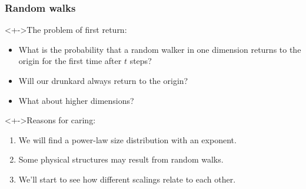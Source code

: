 \begin{frame}
  \frametitle{Random walks \hfill {}}

  \begin{block}<+->{The problem of first return:}
    \begin{itemize}
    \item<+-> 
      What is the probability that a random walker
      in one dimension returns to the origin
      for the first time after $t$ steps?
    \item<+-> 
      Will our drunkard always return to the origin?
    \item<+-> 
      What about higher dimensions?
    \end{itemize}
  \end{block}

  \begin{block}<+->{Reasons for caring:}
    \begin{enumerate}
    \item<+-> 
      We will find a power-law size distribution
      with an  exponent.
    \item<+-> 
      Some physical structures may result from random walks.
    \item<+-> 
      We'll start to see how different scalings relate to each other.
    \end{enumerate}
  \end{block}

\end{frame}





